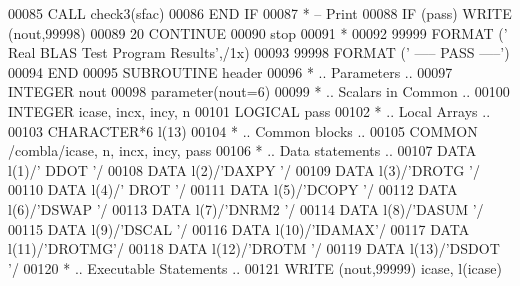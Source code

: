 \begin{DoxyCode}
00085             \textcolor{keyword}{CALL }check3(sfac)
00086 \textcolor{keywordflow}{         END IF}
00087 \textcolor{comment}{*        -- Print}
00088          \textcolor{keywordflow}{IF} (pass) \textcolor{keyword}{WRITE} (nout,99998)
00089    20 \textcolor{keywordflow}{CONTINUE}
00090       stop
00091 \textcolor{comment}{*}
00092 99999 \textcolor{keyword}{FORMAT} (\textcolor{stringliteral}{' Real BLAS Test Program Results'},/1x)
00093 99998 \textcolor{keyword}{FORMAT} (\textcolor{stringliteral}{'                                    ----- PASS -----'})
00094 \textcolor{keyword}{      END}
00095 \textcolor{keyword}{      SUBROUTINE }header
00096 \textcolor{comment}{*     .. Parameters ..}
00097       \textcolor{keywordtype}{INTEGER}          nout
00098       parameter(nout=6)
00099 \textcolor{comment}{*     .. Scalars in Common ..}
00100       \textcolor{keywordtype}{INTEGER}          icase, incx, incy, n
00101       \textcolor{keywordtype}{LOGICAL}          pass
00102 \textcolor{comment}{*     .. Local Arrays ..}
00103       \textcolor{keywordtype}{CHARACTER*6}      l(13)
00104 \textcolor{comment}{*     .. Common blocks ..}
00105       \textcolor{keyword}{COMMON}           /combla/icase, n, incx, incy, pass
00106 \textcolor{comment}{*     .. Data statements ..}
00107       \textcolor{keyword}{DATA}             l(1)/\textcolor{stringliteral}{' DDOT '}/
00108       \textcolor{keyword}{DATA}             l(2)/\textcolor{stringliteral}{'DAXPY '}/
00109       \textcolor{keyword}{DATA}             l(3)/\textcolor{stringliteral}{'DROTG '}/
00110       \textcolor{keyword}{DATA}             l(4)/\textcolor{stringliteral}{' DROT '}/
00111       \textcolor{keyword}{DATA}             l(5)/\textcolor{stringliteral}{'DCOPY '}/
00112       \textcolor{keyword}{DATA}             l(6)/\textcolor{stringliteral}{'DSWAP '}/
00113       \textcolor{keyword}{DATA}             l(7)/\textcolor{stringliteral}{'DNRM2 '}/
00114       \textcolor{keyword}{DATA}             l(8)/\textcolor{stringliteral}{'DASUM '}/
00115       \textcolor{keyword}{DATA}             l(9)/\textcolor{stringliteral}{'DSCAL '}/
00116       \textcolor{keyword}{DATA}             l(10)/\textcolor{stringliteral}{'IDAMAX'}/
00117       \textcolor{keyword}{DATA}             l(11)/\textcolor{stringliteral}{'DROTMG'}/
00118       \textcolor{keyword}{DATA}             l(12)/\textcolor{stringliteral}{'DROTM '}/
00119       \textcolor{keyword}{DATA}             l(13)/\textcolor{stringliteral}{'DSDOT '}/
00120 \textcolor{comment}{*     .. Executable Statements ..}
00121       \textcolor{keyword}{WRITE} (nout,99999) icase, l(icase)

\end{DoxyCode}
